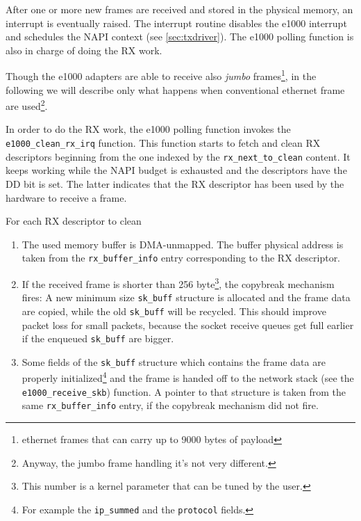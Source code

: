 \vspace{0.5cm}

After one or more new frames are received and stored in the physical memory, an interrupt is eventually raised.
The interrupt routine disables the e1000 interrupt and schedules the NAPI context (see \ref{sec:txdriver}).
The e1000 polling function is also in charge of doing the RX work.

Though the e1000 adapters are able to receive also \emph{jumbo} frames\footnote{ethernet frames that can carry up to 9000 bytes of payload},
in the following we will describe only what happens when conventional ethernet frame are used\footnote{Anyway, the jumbo frame handling 
it's not very different.}.

In order to do the RX work, the e1000 polling function invokes the \texttt{e1000\_clean\_rx\_irq} function.
This function starts to fetch and clean RX descriptors beginning from the one indexed by the \texttt{rx\_next\_to\_clean} content.
It keeps working while the NAPI budget is exhausted and the descriptors have the DD bit is set. The latter indicates that the RX descriptor
has been used by the hardware to receive a frame.

For each RX descriptor to clean
\begin{enumerate}
    \item The used memory buffer is DMA-unmapped. The buffer physical address is taken from the \texttt{rx\_buffer\_info} entry
	  corresponding to the RX descriptor.

    \item If the received frame is shorter than 256 byte\footnote{This number is a kernel parameter that can be tuned by the user.},
	  the copybreak mechanism fires: A new minimum size \texttt{sk\_buff} structure is allocated and the frame data are copied,
	  while the old \texttt{sk\_buff} will be recycled. This should improve packet loss for small packets, because the socket
	  receive queues get full earlier if the enqueued \texttt{sk\_buff} are bigger.
	  
    \item Some fields of the \texttt{sk\_buff} structure which contains the frame data are properly initialized\footnote{For example the
	  \texttt{ip\_summed} and the \texttt{protocol} fields.} and the frame
	  is handed off to the network stack (see the \texttt{e1000\_receive\_skb}) function. A pointer to that structure is
	  taken from the same \texttt{rx\_buffer\_info} entry, if the copybreak mechanism did not fire.
\end{enumerate}


